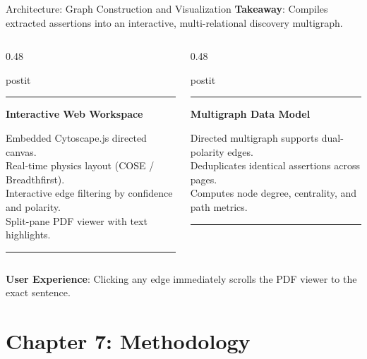 \documentclass[aspectratio=43,10pt]{beamer}
\newcommand{\card}[4][\linewidth]{%
  \begin{beamercolorbox}[wd=#1,sep=0pt,rounded=false,shadow=false]{postit}%
    {\color{#3}\rule{\linewidth}{1.5pt}}\par
    \colorbox{slatebg}{%
      \begin{minipage}{\dimexpr#1-8pt\relax}%
        \vspace{1.5pt}%
        {\footnotesize\bfseries\color{#3}#2}\vspace{1.5pt}\par%
        {\scriptsize\color{darktext}#4}%
        \vspace{1.5pt}%
      \end{minipage}%
    }%
    \par{\color{bordergray}\rule{\linewidth}{0.6pt}}%
  \end{beamercolorbox}%
}
\begin{document}
\begin{frame}{Architecture: Graph Construction and Visualization}
  \textbf{Takeaway}: Compiles extracted assertions into an interactive, multi-relational discovery multigraph.
  \vspace{0.15cm}
  \begin{columns}[T]
    \begin{column}{0.48\textwidth}
      \card{Interactive Web Workspace}{navy}{
        \textbullet{} Embedded Cytoscape.js directed canvas.\\
        \textbullet{} Real-time physics layout (COSE / Breadthfirst).\\
        \textbullet{} Interactive edge filtering by confidence and polarity.\\
        \textbullet{} Split-pane PDF viewer with text highlights.
      }
    \end{column}
    \begin{column}{0.48\textwidth}
      \card{Multigraph Data Model}{teal}{
        \textbullet{} Directed multigraph supports dual-polarity edges.\\
        \textbullet{} Deduplicates identical assertions across pages.\\
        \textbullet{} Computes node degree, centrality, and path metrics.
      }
    \end{column}
  \end{columns}
  \vspace{0.15cm}
  \begin{center}
    {\footnotesize\color{navy}\textbf{User Experience}: Clicking any edge immediately scrolls the PDF viewer to the exact sentence.}
  \end{center}
\end{frame}

\section{Chapter 7: Methodology}
\end{document}
